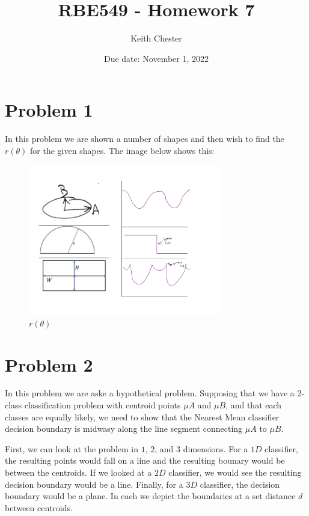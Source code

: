 \documentclass{article}
\title{RBE549 - Homework 7}
\author{Keith Chester}
\date{Due date: November 1, 2022}
\begin{document}
\maketitle

\section*{Problem 1}

In this problem we are shown a number of shapes and then wish to find the $r(\theta)$ for the given shapes. The image below shows this:

\begin{figure}[H]
    \centering
    \includegraphics[width = 0.75\textwidth]{imgs/prob_1.png}
    \caption{$r(\theta)$}
    \label{fig:prob1-1}
\end{figure}

\section*{Problem 2}

In this problem we are aske a hypothetical problem. Supposing that we have a 2-class classification problem with centroid points $\mu A$ and $\mu B$, and that each classes are equally likely, we need to show that the Nearest Mean classifier decision boundary is midwasy along the line segment connecting $\mu A$ to $\mu B$.

First, we can look at the problem in $1$, $2$, and $3$ dimensions. For a $1D$ classifier, the resulting points would fall on a line and the resulting bounary would be between the centroids. If we looked at a $2D$ classifier, we would see the resulting decision boundary would be a line. Finally, for a $3D$ classifier, the decision boundary would be a plane. In each we depict the boundaries at a set distance $d$ between centroids.
\end{document}
